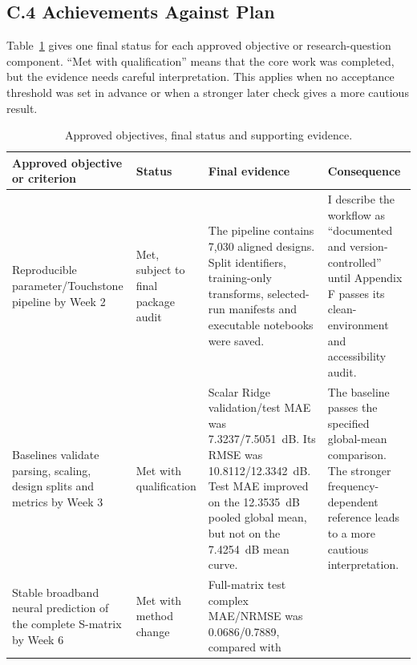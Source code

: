 \clearpage
\PortfolioContentPageCommand
{}
{}
\subsection*{C.4 Achievements Against Plan}
\label{app:c-achievements}

Table~\ref{tab:appendix-c-objectives} gives one final status for each approved
objective or research-question component. ``Met with qualification'' means that
the core work was completed, but the evidence needs careful interpretation.
This applies when no acceptance threshold was set in advance or when a stronger
later check gives a more cautious result.

\begin{table}[!htbp]
    \caption{Approved objectives, final status and supporting evidence.}
    \label{tab:appendix-c-objectives}
    \centering
    \scriptsize
    \begin{tabular}{@{}p{}p{}
                         p{}p{}@{}}
        \toprule
        Approved objective or criterion & Status & Final evidence
                                         & Consequence \\
        \midrule
        Reproducible parameter/Touchstone pipeline by Week 2
          & Met, subject to final package audit
          & The pipeline contains 7,030 aligned designs. Split identifiers,
            training-only transforms, selected-run manifests and executable
            notebooks were saved.
          & I describe the workflow as ``documented and version-controlled''
            until Appendix F passes its clean-environment and accessibility
            audit. \\
        Baselines validate parsing, scaling, design splits and metrics by
        Week 3
          & Met with qualification
          & Scalar Ridge validation/test MAE was 7.3237/7.5051~dB. Its RMSE was
            10.8112/12.3342~dB. Test MAE improved on the 12.3535~dB pooled
            global mean, but not on the 7.4254~dB mean curve.
          & The baseline passes the specified global-mean comparison. The
            stronger frequency-dependent reference leads to a more cautious
            interpretation. \\
        Stable broadband neural prediction of the complete S-matrix by Week 6
          & Met with method change
          & Full-matrix test complex MAE/NRMSE was 0.0686/0.7889, compared with

\end{tabular}
\end{table}
